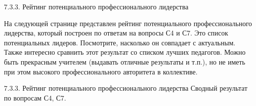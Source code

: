 \begin{frame}{7.3.3. Рейтинг потенциального профессионального лидерства}
\tiny 

На следующей странице представлен рейтинг потенциального профессионального лидерства, который построен по 
ответам на вопросы С4 и С7.
Это список потенциальных лидеров. 
Посмотрите, насколько он совпадает с актуальным. Также интересно сравнить этот результат со списком лучших педагогов. 
Можно быть прекрасным учителем (выдавать отличные результаты и т.п.), но не иметь при этом высокого профессионального 
авторитета в коллективе.
\end{frame}

\begin{frame}{7.3.3. Рейтинг потенциального профессионального лидерства}
\tiny 
Сводный результат по вопросам С4, С7.

\fontsize{5pt}{5}\selectfont
\begin{center}
\begin{tabular}{cllc}

\end{tabular}
\end{center}
\end{frame}


